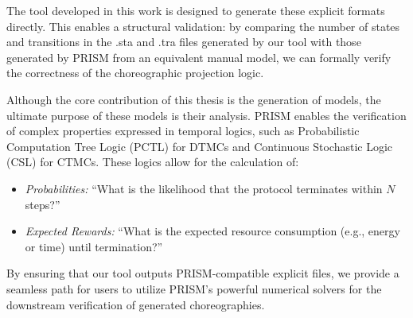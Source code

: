 The tool developed in this work is designed to generate these explicit formats directly. This enables a structural validation: by comparing the number of states and transitions in the .sta and .tra files generated by our tool with those generated by PRISM from an equivalent manual model, we can formally verify the correctness of the choreographic projection logic.

Although the core contribution of this thesis is the generation of models, the ultimate purpose of these models is their analysis. PRISM enables the verification of complex properties expressed in temporal logics, such as Probabilistic Computation Tree Logic (PCTL) for DTMCs and Continuous Stochastic Logic (CSL) for CTMCs. These logics allow for the calculation of:
\begin{itemize}
	\item \textit{Probabilities:} ``What is the likelihood that the protocol terminates within $N$ steps?''
	\item \textit{Expected Rewards:} ``What is the expected resource consumption (e.g., energy or time) until termination?''
\end{itemize}
By ensuring that our tool outputs PRISM-compatible explicit files, we provide a seamless path for users to utilize PRISM’s powerful numerical solvers for the downstream verification of generated choreographies.
